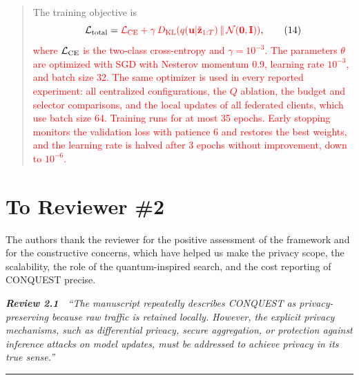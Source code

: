 \documentclass[11pt]{article}
\newenvironment{excerpt}{\begin{quote}\sloppy}{\end{quote}}
\newcommand{\review}[2]{\par\bigskip\noindent\textbf{\textit{Review #1}}\ \ \textit{``#2''}\par\smallskip\hrule\medskip}
\begin{document}
\begin{excerpt}
 The training objective is
\begin{equation}
\mathcal{L}_{\rm total} = \textcolor{red}{\mathcal{L}_{\rm CE}
+ \gamma\,D_{\rm KL}\!\left(q(\mathbf{u}|\tilde{\mathbf{z}}_{1:T})\,\|\,
\mathcal{N}(\mathbf{0},\mathbf{I})\right)},
\tag{14}
\end{equation}
\textcolor{red}{where $\mathcal{L}_{\rm CE}$ is the
two-class cross-entropy and $\gamma=10^{-3}$.}
\textcolor{red}{The parameters $\theta$ are optimized with
SGD with Nesterov momentum 0.9, learning rate $10^{-3}$, and batch
size 32. The same optimizer is used in every reported experiment:
all centralized configurations, the $Q$ ablation, the budget and
selector comparisons, and the local updates of all federated clients,
which use batch size 64.} \textcolor{black}{\textcolor{red}{Training runs
for at most 35 epochs. Early stopping monitors the validation loss
with patience 6 and restores the best weights, and the learning rate
is halved after 3 epochs without improvement, down to $10^{-6}$.}}
\end{excerpt}

\clearpage
\section*{To Reviewer \#2}

The authors thank the reviewer for the positive assessment of the framework
and for the constructive concerns, which have helped us make the privacy
scope, the scalability, the role of the quantum-inspired search, and the
cost reporting of CONQUEST precise.

\review{2.1}{The manuscript repeatedly describes CONQUEST as privacy-preserving because raw traffic is retained locally. However, the explicit privacy mechanisms, such as differential privacy, secure aggregation, or protection against inference attacks on model updates, must be addressed to achieve privacy in its true sense.}
\end{document}
